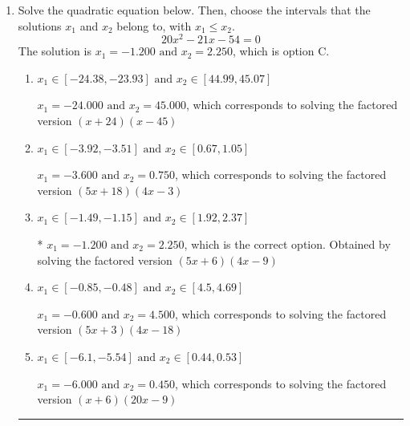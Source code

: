 \documentclass{extbook}[14pt]
\newcommand{\litem}[1]{\item #1

\rule{\textwidth}{0.4pt}}
\begin{document}
\begin{enumerate}\litem{
Solve the quadratic equation below. Then, choose the intervals that the solutions $x_1$ and $x_2$ belong to, with $x_1 \leq x_2$.
\[ 20x^{2} -21 x -54 = 0 \]The solution is \( x_1 = -1.200 \text{ and } x_2 = 2.250 \), which is option C.\begin{enumerate}[label=\Alph*.]
\item \( x_1 \in [-24.38, -23.93] \text{ and } x_2 \in [44.99, 45.07] \)

$x_1 = -24.000 \text{ and } x_2 = 45.000$, which corresponds to solving the factored version $(x + 24)(x -45)$
\item \( x_1 \in [-3.92, -3.51] \text{ and } x_2 \in [0.67, 1.05] \)

$x_1 = -3.600 \text{ and } x_2 = 0.750$, which corresponds to solving the factored version $(5x + 18)(4x -3)$
\item \( x_1 \in [-1.49, -1.15] \text{ and } x_2 \in [1.92, 2.37] \)

* $x_1 = -1.200 \text{ and } x_2 = 2.250$, which is the correct option. Obtained by solving the factored version $(5x + 6)(4x -9)$
\item \( x_1 \in [-0.85, -0.48] \text{ and } x_2 \in [4.5, 4.69] \)

$x_1 = -0.600 \text{ and } x_2 = 4.500$, which corresponds to solving the factored version $(5x + 3)(4x -18)$
\item \( x_1 \in [-6.1, -5.54] \text{ and } x_2 \in [0.44, 0.53] \)

$x_1 = -6.000 \text{ and } x_2 = 0.450$, which corresponds to solving the factored version $(x + 6)(20x -9)$
\end{enumerate}

}
\end{enumerate}
\end{document}
